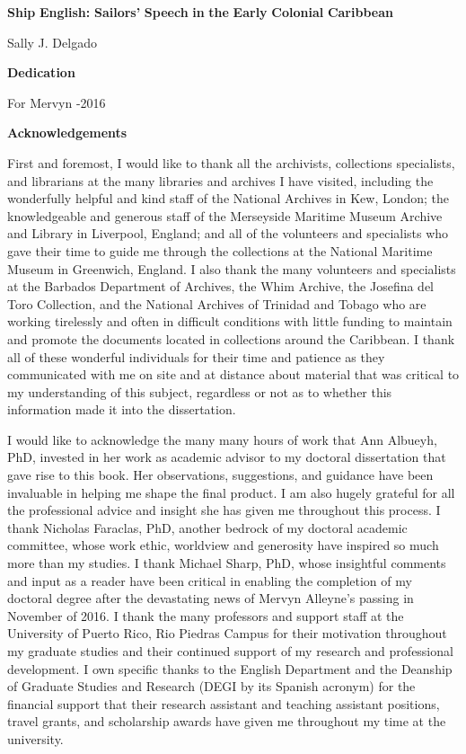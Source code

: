 

\textbf{Ship} \textbf{English:} \textbf{Sailors’} \textbf{Speech} \textbf{in} \textbf{the} \textbf{Early} \textbf{Colonial} \textbf{Caribbean}

Sally J. Delgado

\textbf{Dedication}

For Mervyn \citealt{Alleyne1993}-2016


\textbf{Acknowledgements}

First and foremost, I would like to thank all the archivists, collections specialists, and librarians at the many libraries and archives I have visited, including the wonderfully helpful and kind staff of the National Archives in Kew, London; the knowledgeable and generous staff of the Merseyside Maritime Museum Archive and Library in Liverpool, England; and all of the volunteers and specialists who gave their time to guide me through the collections at the National Maritime Museum in Greenwich, England. I also thank the many volunteers and specialists at the Barbados Department of Archives, the Whim Archive, the Josefina del Toro Collection, and the National Archives of Trinidad and Tobago who are working tirelessly and often in difficult conditions with little funding to maintain and promote the documents located in collections around the Caribbean. I thank all of these wonderful individuals for their time and patience as they communicated with me on site and at distance about material that was critical to my understanding of this subject, regardless or not as to whether this information made it into the dissertation. 

I would like to acknowledge the many many hours of work that Ann Albueyh, PhD, invested in her work as academic advisor to my doctoral dissertation that gave rise to this book. Her observations, suggestions, and guidance have been invaluable in helping me shape the final product. I am also hugely grateful for all the professional advice and insight she has given me throughout this process. I thank Nicholas Faraclas, PhD, another bedrock of my doctoral academic committee, whose work ethic, worldview and generosity have inspired so much more than my studies. I thank Michael Sharp, PhD, whose insightful comments and input as a reader have been critical in enabling the completion of my doctoral degree after the devastating news of Mervyn Alleyne’s passing in November of 2016. I thank the many professors and support staff at the University of Puerto Rico, Rio Piedras Campus for their motivation throughout my graduate studies and their continued support of my research and professional development. I own specific thanks to the English Department and the Deanship of Graduate Studies and Research (DEGI by its Spanish acronym) for the financial support that their research assistant and teaching assistant positions, travel grants, and scholarship awards have given me throughout my time at the university.

